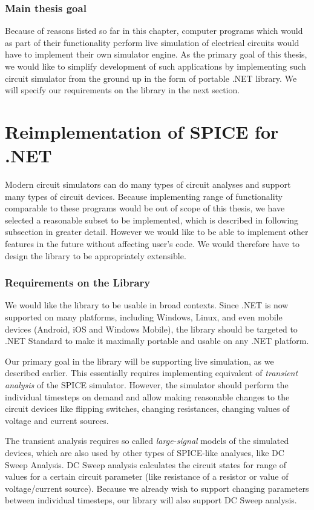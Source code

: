\subsubsection*{Main thesis goal}
Because of reasons listed so far in this chapter, computer programs which would as part of their functionality perform live simulation of electrical circuits would have to implement their own simulator engine. As the primary goal of this thesis, we would like to simplify development of such applications by implementing such circuit simulator from the ground up in the form of portable .NET library. We will specify our requirements on the library in the next section.

\section{Reimplementation of SPICE for .NET}

Modern circuit simulators can do many types of circuit analyses and support many types of circuit devices. Because implementing range of functionality comparable to these programs would be out of scope of this thesis, we have selected a reasonable subset to be implemented, which is described in following subsection in greater detail. However we would like to be able to implement other features in the future without affecting user's code. We would therefore have to design the library to be appropriately extensible.

\subsubsection*{Requirements on the Library}

We would like the library to be usable in broad contexts. Since .NET is now supported on many platforms, including Windows, Linux, and even mobile devices (Android, iOS and Windows Mobile), the library should be targeted to .NET Standard to make it maximally portable and usable on any .NET platform.

Our primary goal in the library will be supporting live simulation, as we described earlier. This essentially requires implementing equivalent of \textit{transient analysis} of the SPICE simulator. However, the simulator should perform the individual timesteps on demand and allow making reasonable changes to the circuit devices like flipping switches, changing resistances, changing values of voltage and current sources.

The transient analysis requires so called \textit{large-signal} models of the simulated devices, which are also used by other types of SPICE-like analyses, like DC Sweep Analysis. DC Sweep analysis calculates the circuit states for range of values for a certain circuit parameter (like resistance of a resistor or value of voltage/current source). Because we already wish to support changing parameters between individual timesteps, our library will also support DC Sweep analysis.

